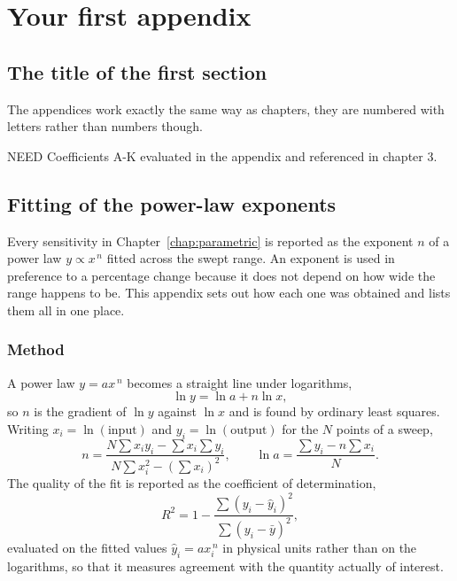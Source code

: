 \chapter{Your first appendix}
\section{The title of the first section}
The appendices work exactly the same way as chapters, they are numbered with letters rather than numbers though.


NEED Coefficients A-K evaluated in the appendix and referenced in chapter 3.


\section{Fitting of the power-law exponents}
\label{app:exponents}

Every sensitivity in Chapter~\ref{chap:parametric} is reported as the
exponent $n$ of a power law $y \propto x^{\,n}$ fitted across the swept
range. An exponent is used in preference to a percentage change because it
does not depend on how wide the range happens to be. This appendix sets out
how each one was obtained and lists them all in one place.

\subsection*{Method}

A power law $y = a x^{\,n}$ becomes a straight line under logarithms,
\begin{equation}
\label{eq:loglin}
\ln y = \ln a + n \ln x ,
\end{equation}
so $n$ is the gradient of $\ln y$ against $\ln x$ and is found by ordinary
least squares. Writing $x_i = \ln(\text{input})$ and
$y_i = \ln(\text{output})$ for the $N$ points of a sweep,
\begin{equation}
\label{eq:lsq}
n = \frac{N \sum x_i y_i - \sum x_i \sum y_i}
         {N \sum x_i^2 - \left(\sum x_i\right)^2},
\qquad
\ln a = \frac{\sum y_i - n \sum x_i}{N} .
\end{equation}
The quality of the fit is reported as the coefficient of determination,
\begin{equation}
\label{eq:r2}
R^2 = 1 - \frac{\sum (y_i - \hat y_i)^2}{\sum (y_i - \bar y)^2},
\end{equation}
evaluated on the fitted values $\hat y_i = a x_i^{\,n}$ in physical units
rather than on the logarithms, so that it measures agreement with the
quantity actually of interest.

